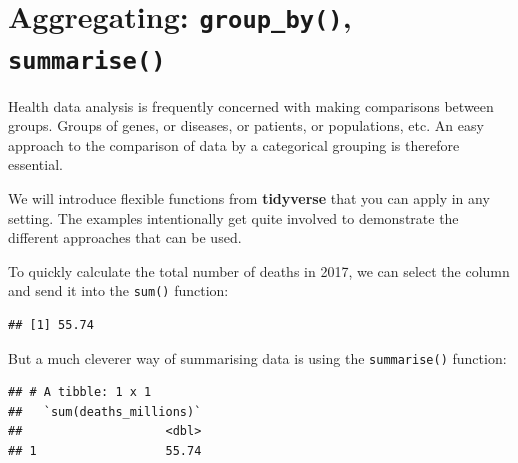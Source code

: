\documentclass[
  12pt,
  krantz2]{krantz}
\makeatletter
\newenvironment{Shaded}{\begin{snugshade}}{\end{snugshade}}
\newcommand{\KeywordTok}[1]{\textcolor[rgb]{0.13,0.29,0.53}{\textbf{#1}}}
\newcommand{\NormalTok}[1]{#1}
\newcommand{\OperatorTok}[1]{\textcolor[rgb]{0.81,0.36,0.00}{\textbf{#1}}}
\newcommand{\StringTok}[1]{\textcolor[rgb]{0.31,0.60,0.02}{#1}}
\newenvironment{kframe}{%
\medskip{}
\setlength{\fboxsep}{.8em}
 \def\at@end@of@kframe{}%
 \ifinner\ifhmode%
  \def\at@end@of@kframe{\end{minipage}}%
  \begin{minipage}{\columnwidth}%
 \fi\fi%
 \def\FrameCommand##1{\hskip\@totalleftmargin \hskip-\fboxsep
 \colorbox{shadecolor}{##1}\hskip-\fboxsep
     \hskip-\linewidth \hskip-\@totalleftmargin \hskip\columnwidth}%
 \MakeFramed {\advance\hsize-\width
   \@totalleftmargin\z@ \linewidth\hsize
   \@setminipage}}%
 {\par\unskip\endMakeFramed%
 \at@end@of@kframe}
\renewenvironment{Shaded}{\begin{kframe}}{\end{kframe}}
\makeatother
\begin{document}
\hypertarget{aggregating-group_by-summarise}{%
\section{\texorpdfstring{Aggregating: \texttt{group\_by()}, \texttt{summarise()}}{Aggregating: group\_by(), summarise()}}\label{aggregating-group_by-summarise}}


Health data analysis is frequently concerned with making comparisons between groups.
Groups of genes, or diseases, or patients, or populations, etc.
An easy approach to the comparison of data by a categorical grouping is therefore essential.

We will introduce flexible functions from \textbf{tidyverse} that you can apply in any setting.
The examples intentionally get quite involved to demonstrate the different approaches that can be used.

To quickly calculate the total number of deaths in 2017, we can select the column and send it into the \texttt{sum()} function:

\begin{Shaded}
\end{Shaded}

\begin{verbatim}
## [1] 55.74
\end{verbatim}

But a much cleverer way of summarising data is using the \texttt{summarise()} function:

\begin{Shaded}
\end{Shaded}

\begin{verbatim}
## # A tibble: 1 x 1
##   `sum(deaths_millions)`
##                    <dbl>
## 1                  55.74
\end{verbatim}
\end{document}
